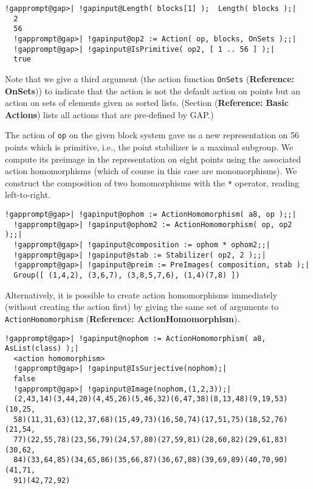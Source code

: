 \documentclass[a4paper,11pt]{report}
\begin{document}
{{ 
\begin{Verbatim}[commandchars=!@|,fontsize=\small,frame=single,label=Example]
  !gapprompt@gap>| !gapinput@Length( blocks[1] );  Length( blocks );|
  2
  56
  !gapprompt@gap>| !gapinput@op2 := Action( op, blocks, OnSets );;|
  !gapprompt@gap>| !gapinput@IsPrimitive( op2, [ 1 .. 56 ] );|
  true
\end{Verbatim}
 

 Note that we give a third argument (the action function \texttt{OnSets} (\textbf{Reference: OnSets})) to indicate that the action is not the default action on points but an
action on sets of elements given as sorted lists. (Section{\nobreakspace} (\textbf{Reference: Basic Actions}) lists all actions that are pre-defined by \textsf{GAP}.) 

 The action of \texttt{op} on the given block system gave us a new representation on 56 points which is
primitive, i.e., the point stabilizer is a maximal subgroup. We compute its
preimage in the representation on eight points using the associated action
homomorphisms (which of course in this case are monomorphisms). We construct
the composition of two homomorphisms with the \texttt{*} operator, reading left-to-right. 

 
\begin{Verbatim}[commandchars=!@|,fontsize=\small,frame=single,label=Example]
  !gapprompt@gap>| !gapinput@ophom := ActionHomomorphism( a8, op );;|
  !gapprompt@gap>| !gapinput@ophom2 := ActionHomomorphism( op, op2 );;|
  !gapprompt@gap>| !gapinput@composition := ophom * ophom2;;|
  !gapprompt@gap>| !gapinput@stab := Stabilizer( op2, 2 );;|
  !gapprompt@gap>| !gapinput@preim := PreImages( composition, stab );|
  Group([ (1,4,2), (3,6,7), (3,8,5,7,6), (1,4)(7,8) ])
\end{Verbatim}
 

 Alternatively, it is possible to create action homomorphisms immediately
(without creating the action first) by giving the same set of arguments to \texttt{ActionHomomorphism} (\textbf{Reference: ActionHomomorphism}). 
\begin{Verbatim}[commandchars=!@|,fontsize=\small,frame=single,label=Example]
  !gapprompt@gap>| !gapinput@nophom := ActionHomomorphism( a8, AsList(class) );|
  <action homomorphism>
  !gapprompt@gap>| !gapinput@IsSurjective(nophom);|
  false
  !gapprompt@gap>| !gapinput@Image(nophom,(1,2,3));|
  (2,43,14)(3,44,20)(4,45,26)(5,46,32)(6,47,38)(8,13,48)(9,19,53)(10,25,
  58)(11,31,63)(12,37,68)(15,49,73)(16,50,74)(17,51,75)(18,52,76)(21,54,
  77)(22,55,78)(23,56,79)(24,57,80)(27,59,81)(28,60,82)(29,61,83)(30,62,
  84)(33,64,85)(34,65,86)(35,66,87)(36,67,88)(39,69,89)(40,70,90)(41,71,
  91)(42,72,92)
\end{Verbatim}
 

}}
\end{document}
